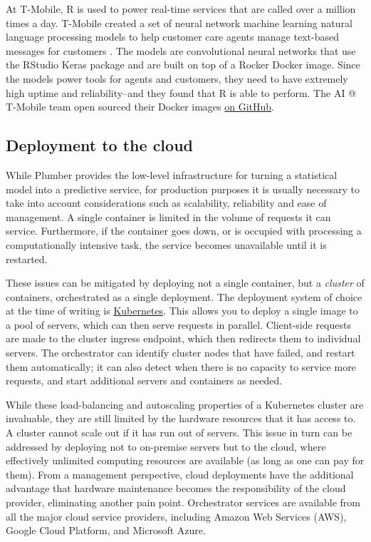 At T-Mobile, R is used to power real-time services that are called over
a million times a day. T-Mobile created a set of neural network machine
learning natural language processing models to help customer care agents
manage text-based messages for customers
\citep{t-mobile_enterprise_2018}. The models are convolutional neural
networks that use the RStudio Keras package and are built on top of a
Rocker Docker image. Since the models power tools for agents and
customers, they need to have extremely high uptime and reliability--and
they found that R is able to perform. The AI @ T-Mobile team open
sourced their Docker images
\href{https://github.com/tmobile/r-tensorflow-api}{on GitHub}.

\hypertarget{deployment-to-the-cloud-hongooi}{%
\subsection{\texorpdfstring{Deployment to the cloud
\citep{hongooi}}{Deployment to the cloud {[}@hongooi{]}}}\label{deployment-to-the-cloud-hongooi}}

While Plumber provides the low-level infrastructure for turning a
statistical model into a predictive service, for production purposes it
is usually necessary to take into account considerations such as
scalability, reliability and ease of management. A single container is
limited in the volume of requests it can service. Furthermore, if the
container goes down, or is occupied with processing a computationally
intensive task, the service becomes unavailable until it is restarted.

These issues can be mitigated by deploying not a single container, but a
\emph{cluster} of containers, orchestrated as a single deployment. The
deployment system of choice at the time of writing is
\href{https://kubernetes.io}{Kubernetes}. This allows you to deploy a
single image to a pool of servers, which can then serve requests in
parallel. Client-side requests are made to the cluster ingress endpoint,
which then redirects them to individual servers. The orchestrator can
identify cluster nodes that have failed, and restart them automatically;
it can also detect when there is no capacity to service more requests,
and start additional servers and containers as needed.

While these load-balancing and autoscaling properties of a Kubernetes
cluster are invaluable, they are still limited by the hardware resources
that it has access to. A cluster cannot scale out if it has run out of
servers. This issue in turn can be addressed by deploying not to
on-premise servers but to the cloud, where effectively unlimited
computing resources are available (as long as one can pay for them).
From a management perspective, cloud deployments have the additional
advantage that hardware maintenance becomes the responsibility of the
cloud provider, eliminating another pain point. Orchestrator services
are available from all the major cloud service providers, including
Amazon Web Services (AWS), Google Cloud Platform, and Microsoft Azure.

